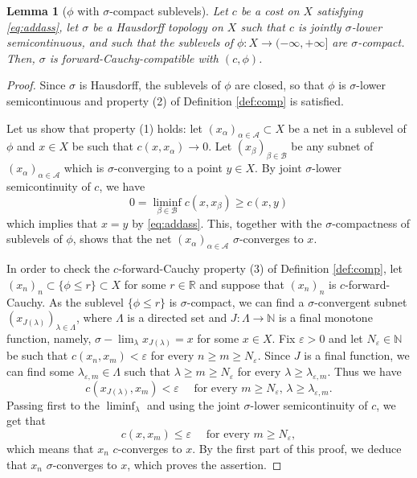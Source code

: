 \documentclass[reqno]{amsart}
\newcounter{results}[section]
\theoremstyle{plain}
\newtheorem{lemma}[results]{Lemma}
\theoremstyle{remark}
\theoremstyle{plain}
\numberwithin{equation}{section}
\theoremstyle{remark}
\newcommand{\N}{\mathbb{N}}
\newcommand{\R}{\mathbb{R}}
\newcommand{\calA}{\mathcal{A}}
\newcommand{\calB}{\mathcal{B}}
\newcommand{\eps}{\varepsilon}
\begin{document}
\begin{lemma}[$\phi$ with $\sigma$-compact sublevels]\label{le:topology}  Let $c$ be a cost on $X$ satisfying \eqref{eq:addass}, let  $\sigma$ be a Hausdorff topology on $X$ such that  $c$ is jointly $\sigma$-lower semicontinuous, and   such that  the  sublevels of $\phi:X\to(-\infty,+\infty]  $ are $\sigma$-compact.  Then, $\sigma$ is forward-Cauchy-compatible with $(c,\phi)$.
\end{lemma}
\begin{proof} Since $\sigma$ is Hausdorff,  the  sublevels of $\phi$ are closed, so that $\phi$ is $\sigma$-lower semicontinuous  and  property (2) of Definition \ref{def:comp} is satisfied. 

Let us show that property (1) holds: let $(x_\alpha)_{\alpha\in \calA} \subset X$ be a net in a sublevel of $\phi$ and $x \in X$ be such that $c(x,x_\alpha)\to 0$. Let $(x_\beta)_{\beta \in \calB}$ be any subnet of $(x_\alpha)_{\alpha\in \calA}$  which is  $\sigma$-converging to a point $y\in X$. By  joint   $\sigma$-lower semicontinuity of $c$, we have
\[ 0 = \liminf_{\beta \in \calB} c(x, x_\beta) \ge c(x,y)\]
which implies that $x=y$ by   \eqref{eq:addass}. This, together with the $\sigma$-compactness of sublevels of $\phi$, shows that the net $(x_\alpha)_{\alpha\in \calA}$ $\sigma$-converges to $x$.

 In order to check the  $c$-forward-Cauchy  property (3) of Definition \ref{def:comp},  let $(x_n)_n \subset \{ \phi \le r \} \subset X$ for some $r  \in \R$ and suppose that $(x_n)_n$ is $c$-forward-Cauchy.  As the sublevel $\{ \phi \le r \} $ is $\sigma$-compact, we can find a $\sigma$-convergent subnet $(x_{J(\lambda)})_{\lambda \in \Lambda}$, where  $\Lambda$ is a directed set  and  $J:\Lambda \to \N$ is a final  monotone   function,  namely,  
$\sigma{-}\lim_\lambda x_{J(\lambda)} =x$ for some $x \in X$. 
Fix $\eps>0$ and let $N_\eps \in \N$ be such that $c(x_n, x_m) < \eps$ for every  $n \ge m \ge N_\eps$. Since $J$ is a final function, we can find some $\lambda_{\eps,m} \in \Lambda$ such that $\lambda \ge m\ge N_{\eps}$ for every $\lambda \ge \lambda_{\eps,m}$. Thus we have
\[ c(x_{J(\lambda)}, x_{m}) < \eps \quad \text{ for every } m \ge N_\eps, \, \lambda \ge \lambda_{\eps,m}.\]
Passing first to the $\liminf_\lambda$ and using the  joint  $\sigma$-lower semicontinuity of $c$, we get that 
\[ c(x, x_m) \le \eps \quad \text{ for every } m \ge N_\eps,\]
which means that $x_n$ $c$-converges to $x$.  By the first part of this proof, we deduce that $x_n$ $\sigma$-converges to $x$,  which proves the assertion. 
\end{proof}
\end{document}
